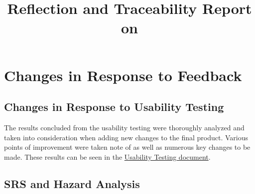 \documentclass{article}
\title{Reflection and Traceability Report on \progname}
\author{\authname}
\date{}
\begin{document}
\maketitle


\section{Changes in Response to Feedback}

\subsection{Changes in Response to Usability Testing}
The results concluded from the usability testing were thoroughly analyzed and taken into consideration when adding new changes to the final product. Various points of improvement were taken note of as well as numerous key changes to be made. These results can be seen in the \href{docs/UsabilityTesting/UsabilityTesting.pdf}{Usability Testing document}.
\subsection{SRS and Hazard Analysis}
\end{document}
